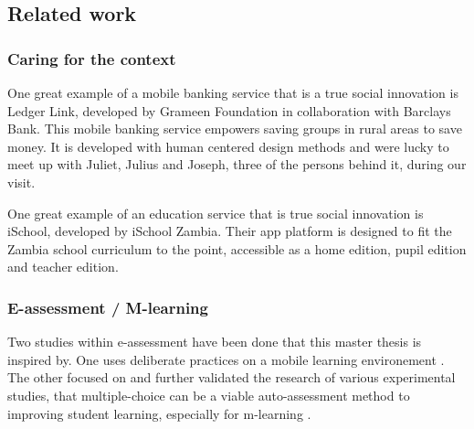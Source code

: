 \subsection{Related work}

\subsubsection{Caring for the context}

One great example of a mobile banking service that is a true social innovation is Ledger Link, developed by Grameen Foundation in collaboration with Barclays Bank. This mobile banking service empowers saving groups in rural areas to save money. It is developed with human centered design methods and were lucky to meet up with Juliet, Julius and Joseph, three of the persons behind it, during our visit. \cite{nissar-linkedin}

One great example of an education service that is true social innovation is iSchool, developed by iSchool Zambia. Their app platform is designed to fit the Zambia school curriculum to the point, accessible as a home edition, pupil edition and teacher edition.

\subsubsection{E-assessment / M-learning}

Two studies within e-assessment have been done that this master thesis is inspired by. One uses deliberate practices on a mobile learning environement \cite{yengin}. The other focused on and further validated the research of various experimental studies, that multiple-choice can be a viable auto-assessment method to improving student learning, especially for m-learning \cite{de-marcos}.
